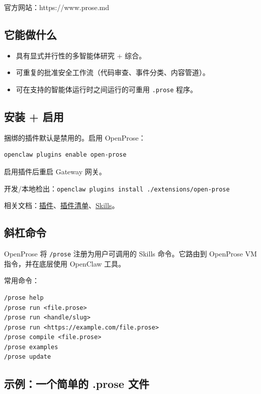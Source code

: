 官方网站：https://www.prose.md

\subsection{它能做什么}


\begin{itemize}
  \item 具有显式并行性的多智能体研究 + 综合。
  \item 可重复的批准安全工作流（代码审查、事件分类、内容管道）。
  \item 可在支持的智能体运行时之间运行的可重用 \texttt{.prose} 程序。
\end{itemize}


\subsection{安装 + 启用}


捆绑的插件默认是禁用的。启用 OpenProse：

\begin{lstlisting}[language=bash]
openclaw plugins enable open-prose
\end{lstlisting}


启用插件后重启 Gateway 网关。

开发/本地检出：\texttt{openclaw plugins install ./extensions/open-prose}

相关文档：\href{/tools/plugin}{插件}、\href{/plugins/manifest}{插件清单}、\href{/tools/skills}{Skills}。

\subsection{斜杠命令}


OpenProse 将 \texttt{/prose} 注册为用户可调用的 Skills 命令。它路由到 OpenProse VM 指令，并在底层使用 OpenClaw 工具。

常用命令：

\begin{lstlisting}
/prose help
/prose run <file.prose>
/prose run <handle/slug>
/prose run <https://example.com/file.prose>
/prose compile <file.prose>
/prose examples
/prose update
\end{lstlisting}


\subsection{示例：一个简单的 .prose 文件}


